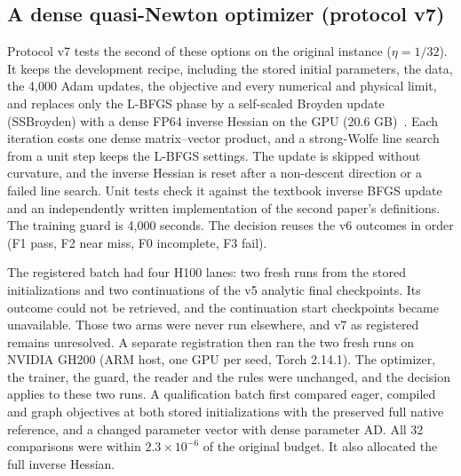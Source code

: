 \documentclass[11pt]{article}
\begin{document}
\subsection{A dense quasi-Newton optimizer (protocol v7)}\label{sec:c36v7}
Protocol v7 tests the second of these options on the original instance
($\eta=1/32$). It keeps the development recipe, including the stored
initial parameters, the data, the 4,000 Adam updates, the objective and
every numerical and physical limit, and replaces only the L-BFGS phase by a
self-scaled Broyden update (SSBroyden) with a dense FP64 inverse Hessian on
the GPU (20.6 GB)~\cite{ssbroyden,kiyani}. Each iteration costs one dense
matrix--vector product, and a strong-Wolfe line search from a unit step
keeps the L-BFGS settings. The update is skipped without curvature, and the
inverse Hessian is reset after a non-descent direction or a failed line
search. Unit tests check it against the textbook inverse BFGS update and an
independently written implementation of the second paper's definitions.
The training guard is 4,000 seconds. The decision reuses the v6 outcomes
in order (F1 pass, F2 near miss, F0 incomplete, F3 fail).

The registered batch had four H100 lanes: two fresh runs from the stored
initializations and two continuations of the v5 analytic final checkpoints.
Its outcome could not be retrieved, and the continuation start checkpoints
became unavailable. Those two arms were never run elsewhere, and v7 as
registered remains unresolved. A separate registration then ran the two
fresh runs on NVIDIA GH200 (ARM host, one GPU per seed, Torch 2.14.1). The
optimizer, the trainer, the guard, the reader and the rules were unchanged,
and the decision applies to these two runs. A qualification batch first
compared eager, compiled and graph objectives at both stored
initializations with the preserved full native reference, and a changed
parameter vector with dense parameter AD. All 32 comparisons were within
$2.3\times10^{-6}$ of the original budget. It also allocated the full
inverse Hessian.
\end{document}
